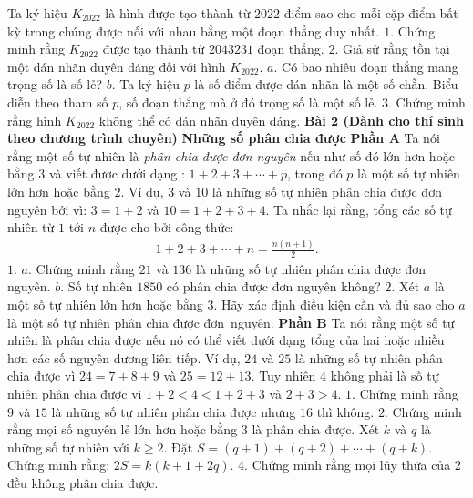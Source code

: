 \begin{multicols}{2}
	\vskip 0.05cm
	Ta ký hiệu $K_{2022}$ là hình được tạo thành từ $2022$ điểm sao cho mỗi cặp điểm bất kỳ trong chúng được nối với nhau bằng một đoạn thẳng duy nhất.
	\vskip 0.05cm
	$1.$ Chứng minh rằng $K_{2022}$ được tạo thành từ $2 043 231$ đoạn thẳng.
	\vskip 0.05cm
	$2.$ Giả sử rằng tồn tại một dán nhãn duyên dáng đối với hình $K_{2022}$.
	\vskip 0.05cm
	$a.$ Có bao nhiêu đoạn thẳng mang trọng số là số lẻ?
	\vskip 0.05cm
	$b.$ Ta ký hiệu $p$ là số điểm được dán nhãn là một số chẵn. Biểu diễn theo tham số $p$, số đoạn thẳng mà ở đó trọng số là một số lẻ.
	\vskip 0.05cm 
	$3.$ Chứng minh rằng hình $K_{2022}$ không thể có dán nhãn duyên dáng.
	\vskip 0.05cm
	\textbf{\color{cackithi}Bài $\pmb{2}$ (Dành cho thí sinh theo chương trình chuyên)}
	\vskip 0.05cm
	\textbf{\color{cackithi}Những số phân chia được}
	\vskip 0.05cm
	\textbf{\color{cackithi}Phần A}
	\vskip 0.05cm
	Ta nói rằng một số tự nhiên là \textit{phân chia được đơn nguyên} nếu như số đó lớn hơn hoặc bằng $3$ và viết được dưới dạng : $1+2+3+\cdots +p$, trong đó $p$ là một số tự nhiên lớn hơn hoặc bằng $2$. Ví dụ, $3$ và $10$ là những số tự nhiên phân chia được đơn nguyên bởi vì: $3 =1+2$  và $10=1+2+3+4$.
	\vskip 0.05cm 
	Ta nhắc lại rằng, tổng các số tự nhiên từ $1$ tới $n$ được cho bởi công thức:
	\setlength{\abovedisplayskip}{4pt}
	\setlength{\belowdisplayskip}{4pt} 
	\begin{align*}
			1+2+3+\cdots+n=\frac{n(n+1)}{2}.
		\end{align*}
	$1.$ $a.$ Chứng minh rằng $21$ và $136$ là những số tự nhiên phân chia được đơn nguyên.  
	\vskip 0.05cm
	$b.$ Số tự nhiên $1850$ có phân chia được đơn nguyên không?
	\vskip 0.05cm
	$2.$ Xét $a$ là một số tự nhiên lớn hơn hoặc bằng $3$. Hãy xác định điều kiện cần và đủ sao cho $a$ là một số tự nhiên phân chia được đơn~nguyên. 
	\vskip 0.05cm
	\textbf{\color{cackithi}Phần B}
	\vskip 0.05cm
	Ta nói rằng một số tự nhiên là phân chia được nếu nó có thể viết dưới dạng tổng của hai hoặc nhiều hơn các số nguyên dương liên tiếp. Ví dụ, $24$ và $25$ là những số tự nhiên phân chia được vì $24 = 7 + 8 + 9$ và $25 = 12 + 13$. Tuy nhiên $4$ không phải là số tự nhiên phân chia được vì $1 + 2 < 4 < 1 + 2 + 3$ và $2 + 3 > 4$.
	\vskip 0.05cm
	$1.$ Chứng minh rằng $9$ và $15$ là những số tự nhiên phân chia được nhưng $16$ thì không.
	\vskip 0.05cm
	$2.$ Chứng minh rằng mọi số nguyên lẻ lớn hơn hoặc bằng $3$ là phân chia được. 
	\vskip 0.05cm
	Xét $k$ và $q$ là những số tự nhiên với $k\ge 2$.  Đặt $S=(q+1)+(q+2)+\cdots+(q+k)$. Chứng minh rằng: $2S=k(k+1+2q)$.
	\vskip 0.05cm
	$4.$ Chứng minh rằng mọi lũy thừa của $2$ đều không phân chia được. 

\end{multicols}
